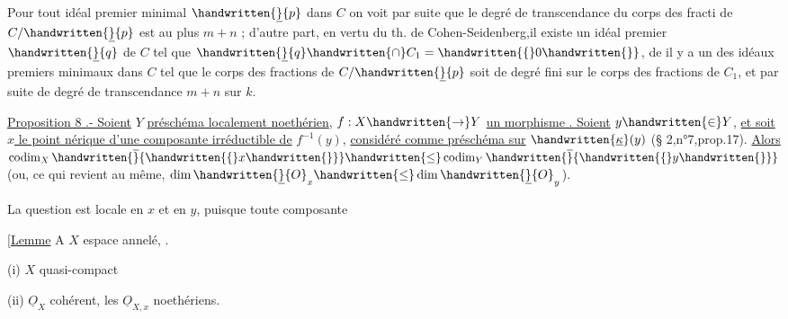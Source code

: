 Pour tout idéal premier minimal $\handwritten{\underline}{p}$  dans $C$\handwritten{,} on voit par suite que le degré de transcendance  du corps des fracti de $C/\handwritten{\underline}{p}$ est au plus $m+n$ ;  d'autre part, en vertu du th. de Cohen-Seidenberg,il existe un idéal premier $\handwritten{\underline}{q}$ de $C$ tel que $\handwritten{\underline}{q}\handwritten{\cap} C_1=\handwritten{\{}0\handwritten{\}}$, de il y a un des idéaux premiers minimaux  dans  $C$ tel que le corps des fractions de $C/\handwritten{\underline}{p}$ soit de degré fini sur le corps des fractions de $C_1$, et par suite de degré de transcendance $m+n$ sur $k$.

\uline{Proposition 8 .- Soient}  $Y$\handwritten{,} \uline{  préschéma localement noethérien}, $f:X\handwritten{\to}Y$ \uline{un morphisme . Soient} $y\handwritten{\in}Y$, \uline{et soit $x$ le point nérique d'une composante irréductible de} $f^{-1}(y)$, \uline{considéré comme préschéma sur} $\handwritten{\underline{\kappa}}(y)$ (\S{} 2,n°7,prop.17). \uline{Alors} $\operatorname{codim}_X\handwritten{\overline}{\handwritten{\{}x\handwritten{\}}}\handwritten{\leq}\operatorname{codim}_Y\handwritten{\overline}{\handwritten{\{}y\handwritten{\}}}$ (ou, ce qui revient au même, $\dim\handwritten{\underline}{O}_x\handwritten{\leq}\dim\handwritten{\underline}{O}_y$).

La question est locale en $x$ et en $y$, puisque toute composante

$\bigl[$\uline{Lemme} A \quad $X$ espace annelé,  .

(i) $X$ quasi-compact

 (ii) $\underline O_X$ cohérent, les $\underline O_{X,x}$ noethériens.

